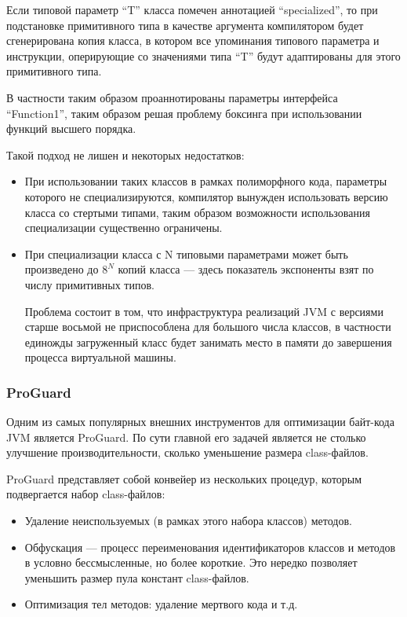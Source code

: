 Если типовой параметр ``T'' класса помечен аннотацией ``specialized'', то при подстановке
примитивного типа в качестве аргумента компилятором будет сгенерирована копия класса, в котором
все упоминания типового параметра и инструкции, оперирующие со значениями типа ``T'' будут
адаптированы для этого примитивного типа.

В частности таким образом проаннотированы параметры интерфейса ``Function1'', таким образом решая
проблему боксинга при использовании функций высшего порядка.

Такой подход не лишен и некоторых недостатков:
\begin{itemize}
    \item При использовании таких классов в рамках полиморфного кода, параметры которого
    не специализируются, компилятор вынужден использовать версию класса со стертыми типами, таким
    образом возможности использования специализации существенно ограничены.
    \item При специализации класса с N типовыми параметрами может быть произведено до $8^N$ копий
    класса --- здесь показатель экспоненты взят по числу примитивных типов.

    Проблема состоит в том, что инфраструктура реализаций JVM с версиями старше восьмой
    не приспособлена для большого числа классов, в частности единожды загруженный класс будет
    занимать место в памяти до завершения процесса виртуальной машины.
\end{itemize}

\subsubsection{ProGuard}
Одним из самых популярных внешних инструментов для оптимизации байт-кода JVM является ProGuard.
По сути главной его задачей является не столько улучшение производительности, сколько уменьшение
размера class-файлов.

ProGuard представляет собой конвейер из нескольких процедур, которым подвергается набор
class-файлов:
\begin{itemize}
    \item Удаление неиспользуемых (в рамках этого набора классов) методов.
    \item Обфускация --- процесс переименования идентификаторов классов и методов в условно
    бессмысленные, но более короткие. Это нередко позволяет уменьшить размер
    пула констант class-файлов.
    \item Оптимизация тел методов: удаление мертвого кода и т.д.
\end{itemize}

